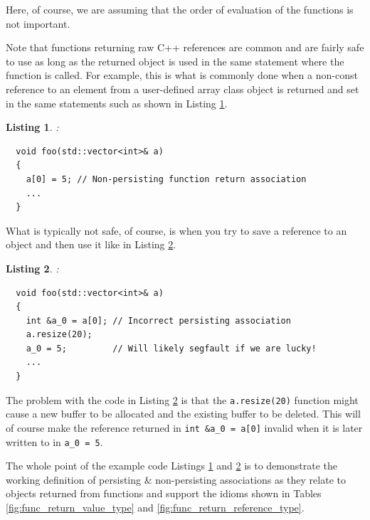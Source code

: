 \documentclass[pdf,ps2pdf,11pt]{SANDreport}
\newtheorem{listing}{Listing}
\begin{document}
Here, of course, we are assuming that the order of evaluation of the
functions is not important.

Note that functions returning raw C++ references are common and are
fairly safe to use as long as the returned object is used in the same
statement where the function is called.  For example, this is what is
commonly done when a non-const reference to an element from a
user-defined array class object is returned and set in the same
statements such as shown in Listing
{}\ref{listing:non-persisting-array-return-1}.

\begin{listing}:\\
\label{listing:non-persisting-array-return-1}
{\small\begin{verbatim}
  void foo(std::vector<int>& a)
  {
    a[0] = 5; // Non-persisting function return association
    ...
  }
\end{verbatim}}
\end{listing}

What is typically not safe, of course, is when you try to save a
reference to an object and then use it like in Listing
{}\ref{listing:bad-persisting-array-return-1}.

\begin{listing}:\\
\label{listing:bad-persisting-array-return-1}
{\small\begin{verbatim}
  void foo(std::vector<int>& a)
  {
    int &a_0 = a[0]; // Incorrect persisting association
    a.resize(20);
    a_0 = 5;         // Will likely segfault if we are lucky!
    ...
  }
\end{verbatim}}
\end{listing}

The problem with the code in Listing
{}\ref{listing:bad-persisting-array-return-1} is that the
{}\texttt{a.resize(20)} function might cause a new buffer to be
allocated and the existing buffer to be deleted.  This will of course
make the reference returned in {}\texttt{int \&a\_0 = a[0]} invalid
when it is later written to in {}\texttt{a\_0 = 5}.

The whole point of the example code Listings
{}\ref{listing:non-persisting-array-return-1} and
{}\ref{listing:bad-persisting-array-return-1} is to demonstrate the
working definition of persisting \& non-persisting associations as
they relate to objects returned from functions and support the idioms
shown in Tables {}\ref{fig:func_return_value_type} and
{}\ref{fig:func_return_reference_type}.
\end{document}
